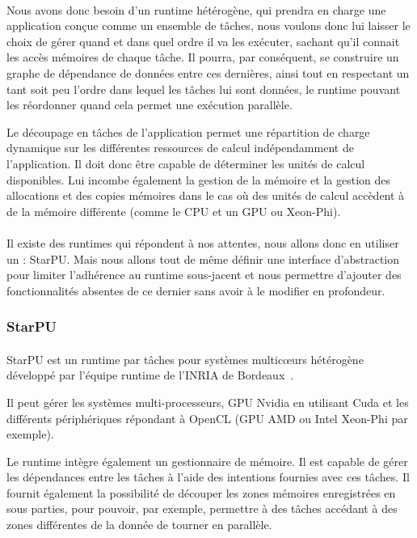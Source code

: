 \paragraph{}
Nous avons donc besoin d'un runtime hétérogène, qui prendra en charge une
application conçue comme un ensemble de tâches, nous voulons donc lui laisser le
choix de gérer quand et dans quel ordre il va les exécuter, sachant qu'il
connait les accès mémoires de chaque tâche. Il pourra, par conséquent, se
construire un graphe de dépendance de données entre ces dernières, ainsi tout en
respectant un tant soit peu l'ordre dans lequel les tâches lui sont données, le
runtime pouvant les réordonner quand cela permet une exécution parallèle.

Le découpage en tâches de l’application permet une répartition de charge
dynamique sur les différentes ressources de calcul indépendamment de
l’application. Il doit donc être capable de déterminer les unités de calcul
disponibles. Lui incombe également la gestion de la mémoire et la gestion des
allocations et des copies mémoires dans le cas où des unités de calcul accèdent
à de la mémoire différente (comme le CPU et un GPU ou Xeon-Phi).

\paragraph{}
Il existe des runtimes qui répondent à nos attentes, nous allons donc en
utiliser un : StarPU. Mais nous allons tout de même définir une interface
d'abstraction pour limiter l'adhérence au runtime sous-jacent et nous permettre
d'ajouter des fonctionnalités absentes de ce dernier sans avoir à le modifier en
profondeur.

\subsubsection{StarPU}
\paragraph{}
\sloppy
StarPU est un runtime par tâches pour systèmes multic\oe{}urs hétérogène
développé par l'équipe runtime de l'INRIA de Bordeaux~\cite{starpu}.

\fussy
Il peut gérer les systèmes multi-processeurs, GPU Nvidia en utilisant Cuda et
les différents périphériques répondant à OpenCL (GPU AMD ou Intel Xeon-Phi par
exemple).

Le runtime intègre également un gestionnaire de mémoire. Il est capable de gérer
les dépendances entre les tâches à l’aide des intentions fournies avec ces
tâches. Il fournit également la possibilité de découper les zones mémoires
enregistrées en sous parties, pour pouvoir, par exemple, permettre à des tâches
accédant à des zones différentes de la donnée de tourner en parallèle.

